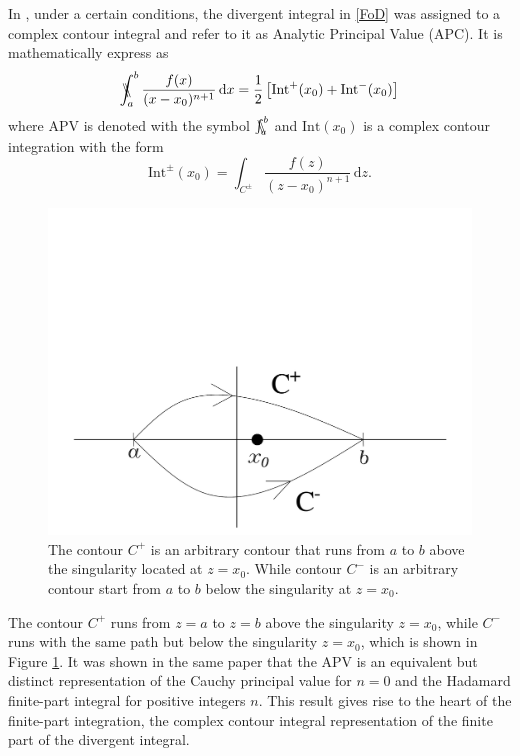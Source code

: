 In \cite{galapon2016cauchy}, under a certain conditions, the divergent integral in \eqref{FoD} was assigned to a complex contour integral and refer to it as Analytic Principal Value (APC). It is mathematically express as
\begin{equation}
    \bbint{a}{b} \frac{f(x)}{(x-x_0)^{n+1}} \, \mathrm{d}x = \frac{1}{2} \left[ \mathrm{Int}^{+}(x_0) + \mathrm{Int}^{-}(x_0) \right]
\end{equation}
where APV is denoted with the symbol $\bbint{a}{b}$ and $\mathrm{Int}(x_0)$ is a complex contour integration with the form
\begin{equation}
    \mathrm{Int}^{\pm}(x_0) = \int_{C^{\pm}} \frac{f(z)}{(z-x_0)^{n+1}} \, \mathrm{d}z.
\end{equation}


\begin{figure}
    \centering
    \includegraphics[width=.75\textwidth]{qwer.pdf}
    \caption{The contour $C^{+}$ is an arbitrary contour that runs from $a$ to $b$ above the singularity located at $z=x_0$. While contour $C^{-}$ is an arbitrary contour start from $a$ to $b$ below the singularity at $z=x_0$.}
    \label{APVc}
\end{figure}

\noindent The contour $C^{+}$ runs from $z=a$ to $z=b$ above the singularity $z=x_0$, while $C^{-}$ runs with the same path but below the singularity $z=x_0$, which is shown in Figure \ref{APVc}. It was shown in the same paper that the APV is an equivalent but distinct representation of the Cauchy principal value for $n=0$ and the Hadamard finite-part integral for positive integers $n$. This result gives rise to the heart of the finite-part integration, the complex contour integral representation of the finite part of the divergent integral.

